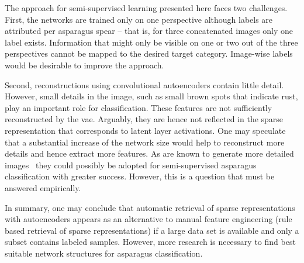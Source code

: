 \bigskip
The approach for semi-supervised learning presented here faces two challenges. First, the networks are trained only on one perspective although labels are attributed per asparagus spear -- that is, for three concatenated images only one label exists. Information that might only be visible on one or two out of the three perspectives cannot be mapped to the desired target category. Image-wise labels would be desirable to improve the approach.

Second, reconstructions using convolutional autoencoders contain little detail. However, small details in the image, such as small brown spots that indicate rust, play an important role for classification. These features are not sufficiently reconstructed by the \acrshort{vae}. Arguably, they are hence not reflected in the sparse representation that corresponds to latent layer activations. One may speculate that a substantial increase of the network size would help to reconstruct more details and hence extract more features. As  are known to generate more detailed images~\citep{bao2017cvae} they could possibly be adopted for semi-supervised asparagus classification with greater success. However, this is a question that must be answered empirically.

\bigskip
In summary, one may conclude that automatic retrieval of sparse representations with autoencoders appears as an alternative to manual feature engineering (rule based retrieval of sparse representations)  if a large data set is available and only a subset contains labeled samples. However, more research is necessary to find best suitable network structures for asparagus classification.
